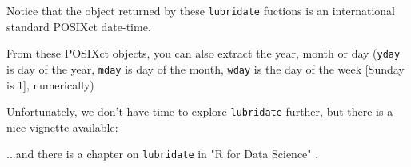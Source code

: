 \documentclass[titlepage]{book}\usepackage{knitr}
\begin{document}
\begin{knitrout}
\color{fgcolor}\begin{kframe}
\begin{alltt}
\hlstd{(}\hlstd{)}                                
\hlstd{(}\hlstd{)}                              
 \hlkwb{<-} \hlstd{(}\hlstd{)}
\end{alltt}
\end{kframe}
\end{knitrout}
Notice that the object returned by these \texttt{lubridate} fuctions is an international standard POSIXct date-time.

From these POSIXct objects, you can also extract the year, month or day (\texttt{yday} is day of the year, \texttt{mday} is day of the month, \texttt{wday} is the day of the week [Sunday is 1], numerically)  

\begin{knitrout}
\color{fgcolor}\begin{kframe}
\begin{alltt}
\hlstd{(}\hlstd{())}
\hlstd{(}\hlstd{())}
                                            
\end{alltt}
\end{kframe}
\end{knitrout}

Unfortunately, we don't have time to explore \texttt{lubridate} further, but there is a nice vignette available:


\begin{knitrout}
\color{fgcolor}\begin{kframe}
\begin{alltt}
\hlstd{(}\hlstd{)}
\end{alltt}
\end{kframe}
\end{knitrout}
...and there is a chapter on \texttt{lubridate} in "R for Data Science" \cite{Wickham2016}.
\end{document}
